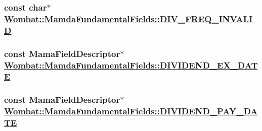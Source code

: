 \hypertarget{classWombat_1_1MamdaFundamentalFields_9d36af2c452a299c5ebeaecd32406682}{
\subsubsection[DIV\_\-FREQ\_\-INVALID]{\setlength{\rightskip}{0pt plus 5cm}const char$\ast$ \hyperlink{classWombat_1_1MamdaFundamentalFields_9d36af2c452a299c5ebeaecd32406682}{Wombat::Mamda\-Fundamental\-Fields::DIV\_\-FREQ\_\-INVALID}}}
\label{classWombat_1_1MamdaFundamentalFields_9d36af2c452a299c5ebeaecd32406682}


\hypertarget{classWombat_1_1MamdaFundamentalFields_b0c6e47ab3c9b8760115c4efe2b35ce3}{
\subsubsection[DIVIDEND\_\-EX\_\-DATE]{\setlength{\rightskip}{0pt plus 5cm}const Mama\-Field\-Descriptor$\ast$ \hyperlink{classWombat_1_1MamdaFundamentalFields_b0c6e47ab3c9b8760115c4efe2b35ce3}{Wombat::Mamda\-Fundamental\-Fields::DIVIDEND\_\-EX\_\-DATE}}}
\label{classWombat_1_1MamdaFundamentalFields_b0c6e47ab3c9b8760115c4efe2b35ce3}


\hypertarget{classWombat_1_1MamdaFundamentalFields_f6dc2abfe3a28d0cf567b516dc83907a}{
\subsubsection[DIVIDEND\_\-PAY\_\-DATE]{\setlength{\rightskip}{0pt plus 5cm}const Mama\-Field\-Descriptor$\ast$ \hyperlink{classWombat_1_1MamdaFundamentalFields_f6dc2abfe3a28d0cf567b516dc83907a}{Wombat::Mamda\-Fundamental\-Fields::DIVIDEND\_\-PAY\_\-DATE}}}
\label{classWombat_1_1MamdaFundamentalFields_f6dc2abfe3a28d0cf567b516dc83907a}


